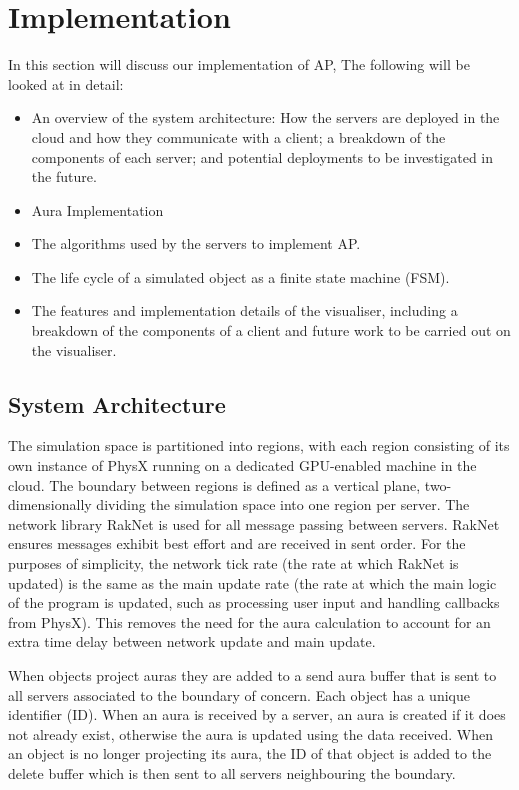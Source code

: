 \chapter{Implementation}
In this section will discuss our implementation of AP, The following will be looked at in detail: \begin{itemize}
	\item An overview of the system architecture: How the servers are deployed in the cloud and how they communicate with a client; a breakdown of the components of each server; and potential deployments to be investigated in the future.
	\item Aura Implementation
	\item The algorithms used by the servers to implement AP.
	\item The life cycle of a simulated object as a finite state machine (FSM).
	\item The features and implementation details of the visualiser, including a breakdown of the components of a client and future work to be carried out on the visualiser.
\end{itemize}

\section{System Architecture}
The simulation space is partitioned into regions, with each region consisting of its own instance of PhysX running on a dedicated GPU-enabled machine in the cloud. The boundary between regions is defined as a vertical plane, two-dimensionally dividing the simulation space into one region per server. The network library RakNet is used for all message passing between servers. RakNet ensures messages exhibit best effort and are received in sent order. For the purposes of simplicity, the network tick rate (the rate at which RakNet is updated) is the same as the main update rate (the rate at which the main logic of the program is updated, such as processing user input and handling callbacks from PhysX). This removes the need for the aura calculation to account for an extra time delay between network update and main update.

When objects project auras they are added to a send aura buffer that is sent to all servers associated to the boundary of concern. Each object has a unique identifier (ID). When an aura is received by a server, an aura is created if it does not already exist, otherwise the aura is updated using the data received. When an object is no longer projecting its aura, the ID of that object is added to the delete buffer which is then sent to all servers neighbouring the boundary.

